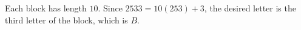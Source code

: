 Each block has length $10$. Since $2533=10(253)+3$, the desired letter is the third letter of the block, which is $\boxed B$.
